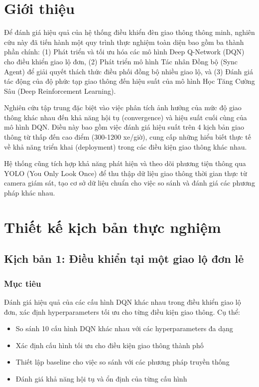 \section{Giới thiệu}

Để đánh giá hiệu quả của hệ thống điều khiển đèn giao thông thông minh, nghiên cứu này đã tiến hành một quy trình thực nghiệm toàn diện bao gồm ba thành phần chính: (1) Phát triển và tối ưu hóa các mô hình Deep Q-Network (DQN) cho điều khiển giao lộ đơn, (2) Phát triển mô hình Tác nhân Đồng bộ (Sync Agent) để giải quyết thách thức điều phối đồng bộ nhiều giao lộ, và (3) Đánh giá tác động của độ phức tạp giao thông đến hiệu suất của mô hình Học Tăng Cường Sâu (Deep Reinforcement Learning).

Nghiên cứu tập trung đặc biệt vào việc phân tích ảnh hưởng của mức độ giao thông khác nhau đến khả năng hội tụ (convergence) và hiệu suất cuối cùng của mô hình DQN. Điều này bao gồm việc đánh giá hiệu suất trên 4 kịch bản giao thông từ thấp đến cao điểm (300-1200 xe/giờ), cung cấp những hiểu biết thực tế về khả năng triển khai (deployment) trong các điều kiện giao thông khác nhau.

Hệ thống cũng tích hợp khả năng phát hiện và theo dõi phương tiện thông qua YOLO (You Only Look Once) để thu thập dữ liệu giao thông thời gian thực từ camera giám sát, tạo cơ sở dữ liệu chuẩn cho việc so sánh và đánh giá các phương pháp khác nhau.
\section{Thiết kế kịch bản thực nghiệm}

\subsection{Kịch bản 1: Điều khiển tại một giao lộ đơn lẻ}

\subsubsection{Mục tiêu}
Đánh giá hiệu quả của các cấu hình DQN khác nhau trong điều khiển giao lộ đơn, xác định hyperparameters tối ưu cho từng điều kiện giao thông. Cụ thể:
\begin{itemize}
    \item So sánh 10 cấu hình DQN khác nhau với các hyperparameters đa dạng
    \item Xác định cấu hình tối ưu cho điều kiện giao thông thành phố
    \item Thiết lập baseline cho việc so sánh với các phương pháp truyền thống
    \item Đánh giá khả năng hội tụ và ổn định của từng cấu hình
\end{itemize}

